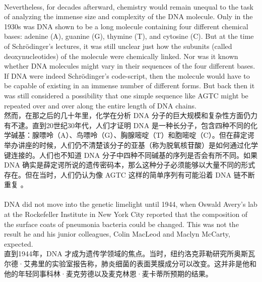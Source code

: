 \documentclass{article}
\begin{document}
\\
Nevertheless, for decades afterward, chemistry would remain unequal to the task of analyzing the immense size and complexity of the DNA molecule. Only in the 1930s was DNA shown to be a long molecule containing four different chemical bases: adenine (A), guanine (G), thymine (T), and cytosine (C). But at the time of Schrödinger’s lectures, it was still unclear just how the subunits (called deoxynucleotides) of the molecule were chemically linked. Nor was it known whether DNA molecules might vary in their sequences of the four different bases. If DNA were indeed Schrödinger’s code-script, then the molecule would have to be capable of existing in an immense number of different forms. But back then it was still considered a possibility that one simple sequence like AGTC might be repeated over and over along the entire length of DNA chains.\\
然而，在那之后的几十年里，化学在分析 DNA 分子的巨大规模和复杂性方面仍力有不逮。直到20世纪30年代，人们才证明 DNA 是一种长分子，包含四种不同的化学碱基：腺嘌呤（A）、鸟嘌呤（G）、胸腺嘧啶（T）和胞嘧啶（C）。但在薛定谔举办讲座的时候，人们仍不清楚该分子的亚基（称为脱氧核苷酸）是如何通过化学键连接的。人们也不知道 DNA 分子中四种不同碱基的序列是否会有所不同。如果 DNA 确实是薛定谔所说的遗传密码本，那么这种分子必须能够以大量不同的形式存在。但在当时，人们仍认为像 AGTC 这样的简单序列有可能沿着 DNA 链不断重复 。 \\

\\
DNA did not move into the genetic limelight until 1944, when Oswald Avery’s lab at the Rockefeller Institute in New York City reported that the composition of the surface coats of pneumonia bacteria could be changed. This was not the result he and his junior colleagues, Colin MacLeod and Maclyn McCarty, expected.\\
直到1944年，DNA 才成为遗传学领域的焦点。当时，纽约洛克菲勒研究所奥斯瓦尔德·艾弗里的实验室报告称，肺炎细菌的表面荚膜成分可以改变。这并非是他和他的年轻同事科林·麦克劳德以及麦克林恩·麦卡蒂所预期的结果。\\
\end{document}
